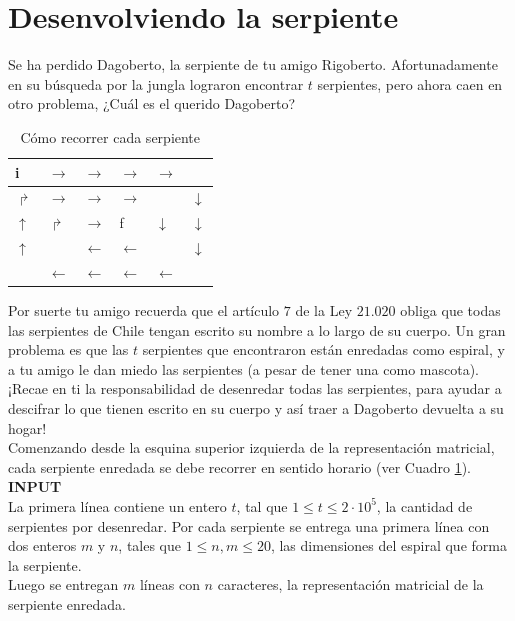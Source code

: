 \section{Desenvolviendo la serpiente} \label{matProbSnakes}
Se ha perdido Dagoberto, la serpiente de tu amigo Rigoberto. Afortunadamente en su búsqueda por la jungla lograron encontrar $t$ serpientes, pero ahora caen en otro problema, ¿Cuál es el querido Dagoberto?\\
\begin{table}
	\begin{tabular}{|p{0.5em}|p{0.5em}|p{0.5em}|p{0.5em}|p{0.5em}|p{0.5em}|}
		\hline
		i&$\rightarrow$&$\rightarrow$&$\rightarrow$&$\rightarrow$&\urCornerArrow\\
		\hline
		$\Rsh$&$\rightarrow$&$\rightarrow$&$\rightarrow$&\urCornerArrow&$\downarrow$\\
		\hline
		$\uparrow$&$\Rsh$&$\rightarrow$&f&$\downarrow$&$\downarrow$\\
		\hline
		$\uparrow$&\llCornerArrow&$\leftarrow$&$\leftarrow$&\lrCornerArrow&$\downarrow$\\
		\hline
		\llCornerArrow&$\leftarrow$&$\leftarrow$&$\leftarrow$&$\leftarrow$&\lrCornerArrow\\
		\hline
	\end{tabular}
	\caption{Cómo recorrer cada serpiente}
	\label{recorrerSerpientes}
\end{table}
Por suerte tu amigo recuerda que el artículo $7$ de la Ley $21.020$ obliga que todas las serpientes de Chile tengan escrito su nombre a lo largo de su cuerpo.
Un gran problema es que las $t$ serpientes que encontraron están enredadas como espiral, y a tu amigo le dan miedo las serpientes (a pesar de tener una como mascota).\\
¡Recae en ti la responsabilidad de desenredar todas las serpientes, para ayudar a descifrar lo que tienen escrito en su cuerpo y así traer a Dagoberto devuelta a su hogar!\\
Comenzando desde la esquina superior izquierda de la representación matricial, cada serpiente enredada se debe recorrer en sentido horario (ver Cuadro \ref{recorrerSerpientes}).\\

\textbf{INPUT}\\
La primera línea contiene un entero $t$, tal que $1 \leq t \leq 2 \cdot 10^5$, la cantidad de serpientes por desenredar.
Por cada serpiente se entrega una primera línea con dos enteros $m$ y $n$, tales que $1 \leq n, m \leq 20$, las dimensiones del espiral que forma la serpiente.\\
Luego se entregan $m$ líneas con $n$ caracteres, la representación matricial de la serpiente enredada.\\

